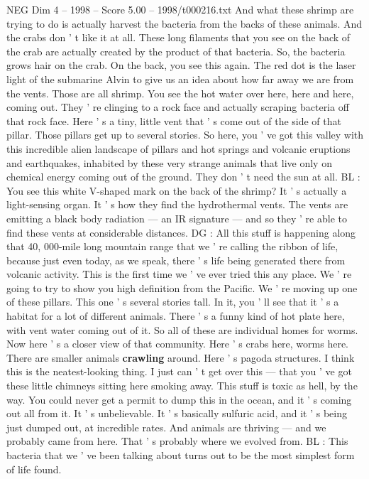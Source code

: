 \begin{textsample}{NEG Dim 4 – 1998 – Score 5.00 – 1998/t000216.txt}
And what these shrimp are trying to do is actually harvest the bacteria from the backs of these animals.
And the crabs don ' t like it at all.
These long filaments that you see on the back of the crab are actually created by the product of that bacteria.
So, the bacteria grows hair on the crab.
On the back, you see this again.
The red dot is the laser light of the submarine Alvin to give us an idea about how far away we are from the vents.
Those are all shrimp.
You see the hot water over here, here and here, coming out.
They ' re clinging to a rock face and actually scraping bacteria off that rock face.
Here ' s a tiny, little vent that ' s come out of the side of that pillar.
Those pillars get up to several stories.
So here, you ' ve got this valley with this incredible alien landscape of pillars and hot springs and volcanic eruptions and earthquakes, inhabited by these very strange animals that live only on chemical energy coming out of the ground.
They don ' t need the sun at all.
BL : You see this white V-shaped mark on the back of the shrimp?
It ' s actually a light-sensing organ.
It ' s how they find the hydrothermal vents.
The vents are emitting a black body radiation — an IR signature — and so they ' re able to find these vents at considerable distances.
DG : All this stuff is happening along that 40, 000-mile long mountain range that we ' re calling the ribbon of life, because just even today, as we speak, there ' s life being generated there from volcanic activity.
This is the first time we ' ve ever tried this any place.
We ' re going to try to show you high definition from the Pacific.
We ' re moving up one of these pillars.
This one ' s several stories tall.
In it, you ' ll see that it ' s a habitat for a lot of different animals.
There ' s a funny kind of hot plate here, with vent water coming out of it.
So all of these are individual homes for worms.
Now here ' s a closer view of that community.
Here ' s crabs here, worms here.
There are smaller animals \textbf{crawling} around.
Here ' s pagoda structures.
I think this is the neatest-looking thing.
I just can ' t get over this — that you ' ve got these little chimneys sitting here smoking away.
This stuff is toxic as hell, by the way.
You could never get a permit to dump this in the ocean, and it ' s coming out all from it.
It ' s unbelievable.
It ' s basically sulfuric acid, and it ' s being just dumped out, at incredible rates.
And animals are thriving — and we probably came from here.
That ' s probably where we evolved from.
BL : This bacteria that we ' ve been talking about turns out to be the most simplest form of life found.

\end{textsample}
